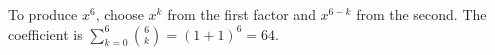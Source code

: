 To produce $ x^6 $, choose $ x^k $ from the first factor and $ x^{6-k}$ from the second. The coefficient is $\sum_{k=0}^6\binom6k=(1+1)^6=\boxed{64}$.
